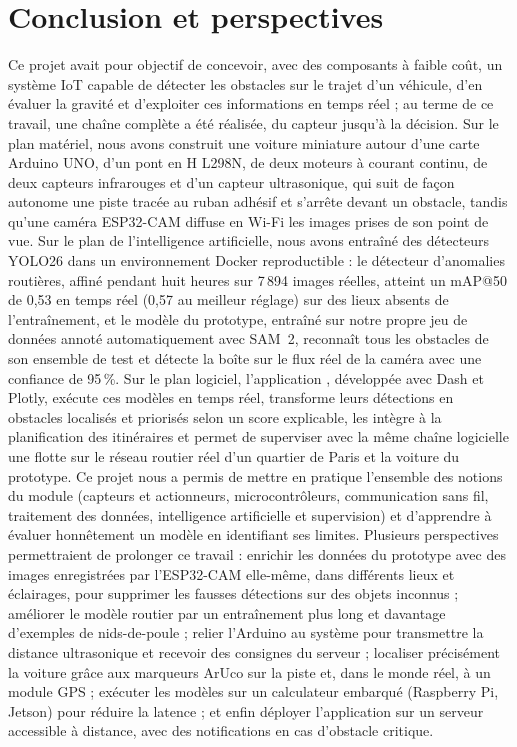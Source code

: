 \chapter*{Conclusion et perspectives}

Ce projet avait pour objectif de concevoir, avec des composants à faible coût, un système IoT capable de détecter les
obstacles sur le trajet d'un véhicule, d'en évaluer la gravité et d'exploiter ces informations en temps réel ; au terme
de ce travail, une chaîne complète a été réalisée, du capteur jusqu'à la décision. Sur le plan matériel, nous avons
construit une voiture miniature autour d'une carte Arduino UNO, d'un pont en H L298N, de deux moteurs à courant
continu, de deux capteurs infrarouges et d'un capteur ultrasonique, qui suit de façon autonome une piste tracée au
ruban adhésif et s'arrête devant un obstacle, tandis qu'une caméra ESP32-CAM diffuse en Wi-Fi les images prises de son
point de vue. Sur le plan de l'intelligence artificielle, nous avons entraîné des détecteurs YOLO26 dans un
environnement Docker reproductible : le détecteur d'anomalies routières, affiné pendant huit heures sur 7\,894 images
réelles, atteint un mAP@50 de 0,53 en temps réel (0,57 au meilleur réglage) sur des lieux absents de l'entraînement,
et le modèle du prototype, entraîné sur notre propre jeu de données annoté automatiquement avec SAM~2, reconnaît tous
les obstacles de son ensemble de test et détecte la boîte sur le flux réel de la caméra avec une confiance de
95\,\%. Sur le plan logiciel, l'application \app, développée avec Dash et Plotly, exécute ces modèles en temps réel,
transforme leurs détections en obstacles localisés et priorisés selon un score explicable, les intègre à la
planification des itinéraires et permet de superviser avec la même chaîne logicielle une flotte sur le réseau routier
réel d'un quartier de Paris et la voiture du prototype. Ce projet nous a permis de mettre en pratique l'ensemble des
notions du module (capteurs et actionneurs, microcontrôleurs, communication sans fil, traitement des données,
intelligence artificielle et supervision) et d'apprendre à évaluer honnêtement un modèle en identifiant ses limites.
Plusieurs perspectives permettraient de prolonger ce travail : enrichir les données du prototype avec des images
enregistrées par l'ESP32-CAM elle-même, dans différents lieux et éclairages, pour supprimer les fausses détections sur
des objets inconnus ; améliorer le modèle routier par un entraînement plus long et davantage d'exemples de
nids-de-poule ; relier l'Arduino au système pour transmettre la distance ultrasonique et recevoir des consignes du
serveur ; localiser précisément la voiture grâce aux marqueurs ArUco sur la piste et, dans le monde réel, à un module
GPS ; exécuter les modèles sur un calculateur embarqué (Raspberry Pi, Jetson) pour réduire la latence ; et enfin
déployer l'application sur un serveur accessible à distance, avec des notifications en cas d'obstacle critique.
